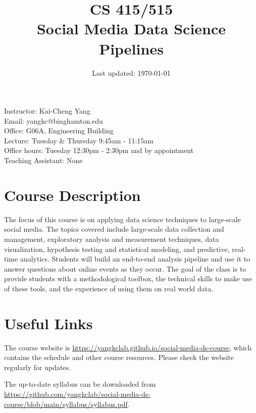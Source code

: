 \documentclass[11pt,article,oneside]{memoir} %
\makeatletter
\def\myauthor{Author}
\def\mytitle{Title}
\def\myemail{yangkc@binghamton.edu}
\def\myauthor{Kai-Cheng Yang}
\def\mytitle{{\normalsize CS 415/515} \\ \HUGE{} Social Media Data Science Pipelines}
\makeatother
\begin{document}

\title{\LARGE \mytitle} %
\date{Last updated: \today}


\maketitle

Instructor: \myauthor \\
Email: \myemail\\
Office: G06A, Engineering Building \\
Lecture: Tuesday \& Thursday 9:45am - 11:15am \\
Office hours: Tuesday 12:30pm - 2:30pm and by appointment \\

Teaching Assistant: None \\

\section{Course Description}%

The focus of this course is on applying data science techniques to large-scale social media.
The topics covered include large-scale data collection and management, exploratory analysis and measurement techniques, data visualization, hypothesis testing and statistical modeling, and predictive, real-time analytics.
Students will build an end-to-end analysis pipeline and use it to answer questions about online events as they occur.
The goal of the class is to provide students with a methodological toolbox, the technical skills to make use of these tools, and the experience of using them on real world data.


\section{Useful Links}

The course website is \url{https://yangkclab.github.io/social-media-ds-course}, which contains the schedule and other course resources.
Please check the website regularly for updates.

The up-to-date syllabus can be downloaded from \url{https://github.com/yangkclab/social-media-ds-course/blob/main/syllabus/syllabus.pdf}.
\end{document}
